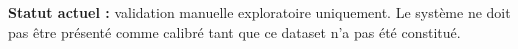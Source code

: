 \noindent\textbf{Statut actuel :} validation manuelle exploratoire uniquement.
Le système ne doit pas être présenté comme calibré tant que ce dataset
n'a pas été constitué.




